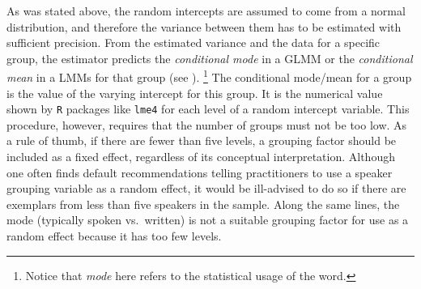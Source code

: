 As was stated above, the random intercepts are assumed to come from a normal distribution, and therefore the variance between them has to be estimated with sufficient precision.
From the estimated variance and the data for a specific group, the estimator predicts the \textit{conditional mode} in a GLMM or the \textit{conditional mean} in a LMMs for that group (see \citealt[Ch.~1]{Bates2010}).%
\footnote{Notice that \textit{mode} here refers to the statistical usage of the word.}
The conditional mode\slash mean for a group is the value of the varying intercept for this group.
It is the numerical value shown by \texttt{R} packages like \texttt{lme4} for each level of a random intercept variable.
This procedure, however, requires that the number of groups must not be too low.
As a rule of thumb, if there are fewer than five levels, a grouping factor should be included as a fixed effect, regardless of its conceptual interpretation.
Although one often finds default recommendations telling practitioners to use a speaker grouping variable as a random effect, it would be ill-advised to do so if there are exemplars from less than five speakers in the sample.
Along the same lines, the mode (typically spoken vs.\ written) is not a suitable grouping factor for use as a random effect because it has too few levels.

